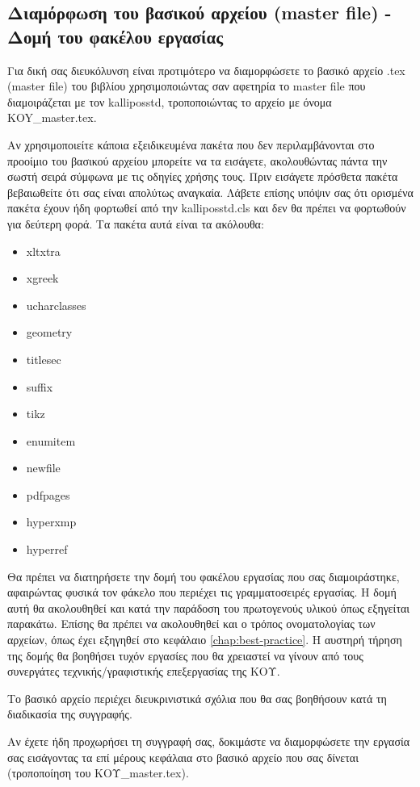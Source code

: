 \begin{refsection}
\section{Διαμόρφωση του βασικού αρχείου (master file) - Δομή του φακέλου εργασίας}
Για δική σας διευκόλυνση είναι προτιμότερο να διαμορφώσετε το βασικό αρχείο .tex (master file) του βιβλίου
χρησιμοποιώντας σαν αφετηρία το master file που διαμοιράζεται με τον kalliposstd, τροποποιώντας το αρχείο
με όνομα KOY\_master.tex.

Αν χρησιμοποιείτε κάποια εξειδικευμένα πακέτα που δεν περιλαμβάνονται στο προοίμιο του βασικού αρχείου
μπορείτε να τα εισάγετε, ακολουθώντας πάντα την σωστή σειρά σύμφωνα με τις οδηγίες χρήσης τους.
Πριν εισάγετε πρόσθετα πακέτα βεβαιωθείτε ότι σας είναι απολύτως αναγκαία. Λάβετε επίσης υπόψιν σας ότι
ορισμένα πακέτα έχουν ήδη φορτωθεί από την kalliposstd.cls και δεν θα πρέπει να φορτωθούν για δεύτερη φορά.
Τα πακέτα αυτά είναι τα ακόλουθα:
\begin{multicols}{2}
\begin{itemize}
\item xltxtra
\item xgreek
\item ucharclasses
\item geometry
\item titlesec
\item suffix
\item tikz
\item enumitem
\item newfile
\item pdfpages
\item hyperxmp
\item hyperref
\end{itemize}
\end{multicols}
Θα πρέπει να διατηρήσετε την δομή του φακέλου εργασίας που σας διαμοιράστηκε, αφαιρώντας φυσικά τον φάκελο
που περιέχει τις γραμματοσειρές εργασίας. Η δομή αυτή θα ακολουθηθεί και κατά την παράδοση του πρωτογενούς
υλικού όπως εξηγείται παρακάτω. Επίσης θα πρέπει να ακολουθηθεί και ο τρόπος ονοματολογίας των αρχείων,
όπως έχει εξηγηθεί στο κεφάλαιο \ref{chap:best-practice}. Η αυστηρή τήρηση της δομής θα βοηθήσει τυχόν
εργασίες που θα χρειαστεί να γίνουν από τους συνεργάτες τεχνικής/γραφιστικής επεξεργασίας της ΚΟΥ.

Το βασικό αρχείο περιέχει διευκρινιστικά σχόλια που θα σας βοηθήσουν κατά τη διαδικασία της συγγραφής.

Αν έχετε ήδη προχωρήσει τη συγγραφή σας, δοκιμάστε να διαμορφώσετε την εργασία σας εισάγοντας τα επί μέρους
κεφάλαια στο βασικό αρχείο που σας δίνεται (τροποποίηση του ΚΟΥ\_master.tex).

\end{refsection}

